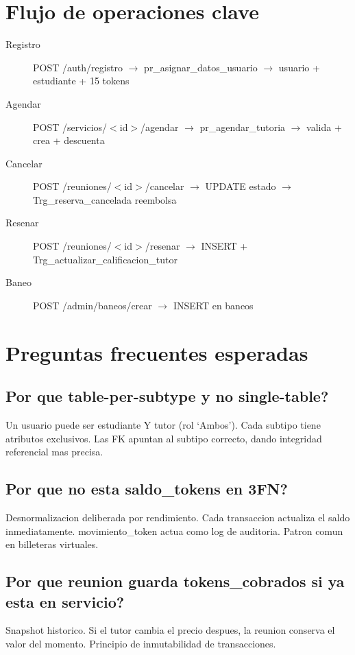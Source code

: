 \documentclass[10pt,a4paper]{article}
\begin{document}
\section{Flujo de operaciones clave}
\begin{description}
    \item[Registro] POST /auth/registro $\rightarrow$ pr\_asignar\_datos\_usuario $\rightarrow$ usuario + estudiante + 15 tokens
    \item[Agendar] POST /servicios/$<$id$>$/agendar $\rightarrow$ pr\_agendar\_tutoria $\rightarrow$ valida + crea + descuenta
    \item[Cancelar] POST /reuniones/$<$id$>$/cancelar $\rightarrow$ UPDATE estado $\rightarrow$ Trg\_reserva\_cancelada reembolsa
    \item[Resenar] POST /reuniones/$<$id$>$/resenar $\rightarrow$ INSERT + Trg\_actualizar\_calificacion\_tutor
    \item[Baneo] POST /admin/baneos/crear $\rightarrow$ INSERT en baneos
\end{description}

\section{Preguntas frecuentes esperadas}

\subsection{Por que table-per-subtype y no single-table?}
Un usuario puede ser estudiante Y tutor (rol `Ambos'). Cada subtipo tiene atributos exclusivos. Las FK apuntan al subtipo correcto, dando integridad referencial mas precisa.

\subsection{Por que no esta saldo\_tokens en 3FN?}
Desnormalizacion deliberada por rendimiento. Cada transaccion actualiza el saldo inmediatamente. movimiento\_token actua como log de auditoria. Patron comun en billeteras virtuales.

\subsection{Por que reunion guarda tokens\_cobrados si ya esta en servicio?}
Snapshot historico. Si el tutor cambia el precio despues, la reunion conserva el valor del momento. Principio de inmutabilidad de transacciones.
\end{document}
